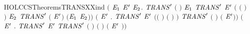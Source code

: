 \begin{SaveVerbatim}{HOLCCSTheoremsTRANSXXind}
       \ensuremath{(}\HOLSymConst{\HOLTokenForall{}}  \ensuremath{\HOLBoundVar{E}\sb{\mathrm{1}}} \ensuremath{\HOLBoundVar{E}\sp{\prime}} \ensuremath{\HOLBoundVar{E}\sb{\mathrm{2}}}.
            \ensuremath{\HOLBoundVar{TRANS}\sp{\prime}}  \ensuremath{(} \ensuremath{)} \ensuremath{\HOLBoundVar{E}\sb{\mathrm{1}}} \HOLSymConst{\HOLTokenConj{}}
            \ensuremath{\HOLBoundVar{TRANS}\sp{\prime}} \ensuremath{\HOLBoundVar{E}\sp{\prime}} \ensuremath{(} \ensuremath{(} \ensuremath{)}\ensuremath{)} \ensuremath{\HOLBoundVar{E}\sb{\mathrm{2}}} \HOLSymConst{\HOLTokenImp{}}
            \ensuremath{\HOLBoundVar{TRANS}\sp{\prime}} \ensuremath{(} \HOLSymConst{\ensuremath{\mid}} \ensuremath{\HOLBoundVar{E}\sp{\prime}}\ensuremath{)} \HOLConst{\ensuremath{\tau}} \ensuremath{(}\ensuremath{\HOLBoundVar{E}\sb{\mathrm{1}}} \HOLSymConst{\ensuremath{\mid}} \ensuremath{\HOLBoundVar{E}\sb{\mathrm{2}}}\ensuremath{)}\ensuremath{)} \HOLSymConst{\HOLTokenConj{}}
       \ensuremath{(}\HOLSymConst{\HOLTokenForall{}}  \ensuremath{\HOLBoundVar{E}\sp{\prime}}  .
            \ensuremath{\HOLBoundVar{TRANS}\sp{\prime}}   \ensuremath{\HOLBoundVar{E}\sp{\prime}} \HOLSymConst{\HOLTokenConj{}}
            \ensuremath{(}\ensuremath{(} \HOLSymConst{\ensuremath{=}} \HOLConst{\ensuremath{\tau}}\ensuremath{)} \HOLSymConst{\HOLTokenDisj{}} \ensuremath{(} \HOLSymConst{\ensuremath{=}}  \ensuremath{)} \HOLSymConst{\HOLTokenConj{}}  \HOLConst{\HOLTokenNotIn{}}  \HOLSymConst{\HOLTokenConj{}}   \HOLConst{\HOLTokenNotIn{}} \ensuremath{)} \HOLSymConst{\HOLTokenImp{}}
            \ensuremath{\HOLBoundVar{TRANS}\sp{\prime}} \ensuremath{(}  \ensuremath{)}  \ensuremath{(}  \ensuremath{\HOLBoundVar{E}\sp{\prime}}\ensuremath{)}\ensuremath{)} \HOLSymConst{\HOLTokenConj{}}
       \ensuremath{(}\HOLSymConst{\HOLTokenForall{}}  \ensuremath{\HOLBoundVar{E}\sp{\prime}} .
            \ensuremath{\HOLBoundVar{TRANS}\sp{\prime}}   \ensuremath{\HOLBoundVar{E}\sp{\prime}} \HOLSymConst{\HOLTokenImp{}}
            \ensuremath{\HOLBoundVar{TRANS}\sp{\prime}} \ensuremath{(}  \ensuremath{)} \ensuremath{(}  \ensuremath{)} \ensuremath{(} \ensuremath{\HOLBoundVar{E}\sp{\prime}} \ensuremath{)}\ensuremath{)} \HOLSymConst{\HOLTokenConj{}}

\end{SaveVerbatim}
